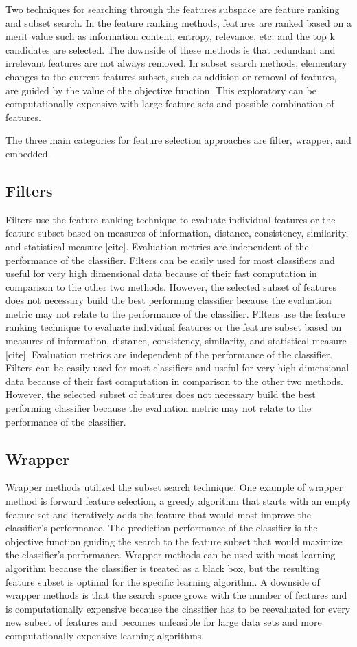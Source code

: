 Two techniques for searching through the features subspace are feature ranking and subset search. In the feature ranking methods, features are ranked based on a merit value such as information content, entropy, relevance, etc. and the top k candidates are selected. The downside of these methods is that redundant and irrelevant features are not always removed. In subset search methods, elementary changes to the current features subset, such as addition or removal of features, are guided by the value of the objective function. This exploratory can be computationally expensive with large feature sets and possible combination of features. 

The three main categories for feature selection approaches are filter, wrapper, and embedded. 
\subsection{Filters}
\indent Filters use the feature ranking technique to evaluate individual features or the feature subset based on measures of information, distance, consistency, similarity, and statistical measure [cite]. Evaluation metrics are independent of the performance of the classifier. Filters can be easily used for most classifiers and useful for very high dimensional data because of their fast computation in comparison to the other two methods. However, the selected subset of features does not necessary build the best performing classifier because the evaluation metric may not relate to the performance of the classifier. 
Filters use the feature ranking technique to evaluate individual features or the feature subset based on measures of information, distance, consistency, similarity, and statistical measure [cite]. Evaluation metrics are independent of the performance of the classifier. Filters can be easily used for most classifiers and useful for very high dimensional data because of their fast computation in comparison to the other two methods. However, the selected subset of features does not necessary build the best performing classifier because the evaluation metric may not relate to the performance of the classifier. 
\subsection{Wrapper}
\indent Wrapper methods utilized the subset search technique. One example of wrapper method is forward feature selection, a greedy algorithm that starts with an empty feature set and iteratively adds the feature that would most improve the classifier’s performance. The prediction performance of the classifier is the objective function guiding the search to the feature subset that would maximize the classifier’s performance. Wrapper methods can be used with most learning algorithm because the classifier is treated as a black box, but the resulting feature subset is optimal for the specific learning algorithm. A downside of wrapper methods is that the search space grows with the number of features and is computationally expensive because the classifier has to be reevaluated for every new subset of features and becomes unfeasible for large data sets and more computationally expensive learning algorithms. 
